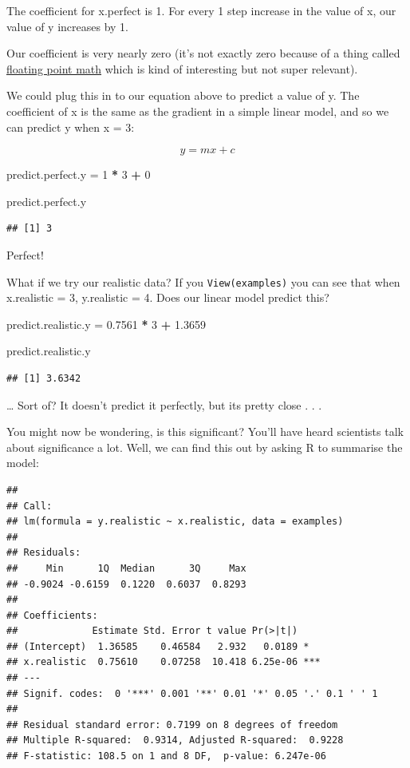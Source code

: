 \documentclass[
]{book}
\newenvironment{Shaded}{\begin{snugshade}}{\end{snugshade}}
\newcommand{\DecValTok}[1]{\textcolor[rgb]{0.00,0.00,0.81}{#1}}
\newcommand{\FloatTok}[1]{\textcolor[rgb]{0.00,0.00,0.81}{#1}}
\newcommand{\NormalTok}[1]{#1}
\newcommand{\OperatorTok}[1]{\textcolor[rgb]{0.81,0.36,0.00}{\textbf{#1}}}
\newcommand{\StringTok}[1]{\textcolor[rgb]{0.31,0.60,0.02}{#1}}
\begin{document}
The coefficient for x.perfect is 1. For every 1 step increase in the value of x, our value of y increases by 1.

Our coefficient is very nearly zero (it's not exactly zero because of a thing called \href{https://0.30000000000000004.com/}{floating point math} which is kind of interesting but not super relevant).

We could plug this in to our equation above to predict a value of y. The coefficient of x is the same as the gradient in a simple linear model, and so we can predict y when x = 3:

\[ y = mx + c \]

\begin{Shaded}
\begin{Highlighting}[]
\NormalTok{predict.perfect.y =}\StringTok{ }\DecValTok{1} \OperatorTok{*}\StringTok{ }\DecValTok{3} \OperatorTok{+}\StringTok{ }\DecValTok{0}

\NormalTok{predict.perfect.y}
\end{Highlighting}
\end{Shaded}

\begin{verbatim}
## [1] 3
\end{verbatim}

Perfect!

What if we try our realistic data? If you \texttt{View(examples)} you can see that when x.realistic = 3, y.realistic = 4. Does our linear model predict this?

\begin{Shaded}
\begin{Highlighting}[]
\NormalTok{predict.realistic.y =}\StringTok{ }\FloatTok{0.7561} \OperatorTok{*}\StringTok{ }\DecValTok{3} \OperatorTok{+}\StringTok{ }\FloatTok{1.3659}

\NormalTok{predict.realistic.y}
\end{Highlighting}
\end{Shaded}

\begin{verbatim}
## [1] 3.6342
\end{verbatim}

\ldots{} Sort of? It doesn't predict it perfectly, but its pretty close . . .

You might now be wondering, is this significant? You'll have heard scientists talk about significance a lot. Well, we can find this out by asking R to summarise the model:

\begin{verbatim}
## 
## Call:
## lm(formula = y.realistic ~ x.realistic, data = examples)
## 
## Residuals:
##     Min      1Q  Median      3Q     Max 
## -0.9024 -0.6159  0.1220  0.6037  0.8293 
## 
## Coefficients:
##             Estimate Std. Error t value Pr(>|t|)    
## (Intercept)  1.36585    0.46584   2.932   0.0189 *  
## x.realistic  0.75610    0.07258  10.418 6.25e-06 ***
## ---
## Signif. codes:  0 '***' 0.001 '**' 0.01 '*' 0.05 '.' 0.1 ' ' 1
## 
## Residual standard error: 0.7199 on 8 degrees of freedom
## Multiple R-squared:  0.9314,	Adjusted R-squared:  0.9228 
## F-statistic: 108.5 on 1 and 8 DF,  p-value: 6.247e-06
\end{verbatim}
\end{document}

